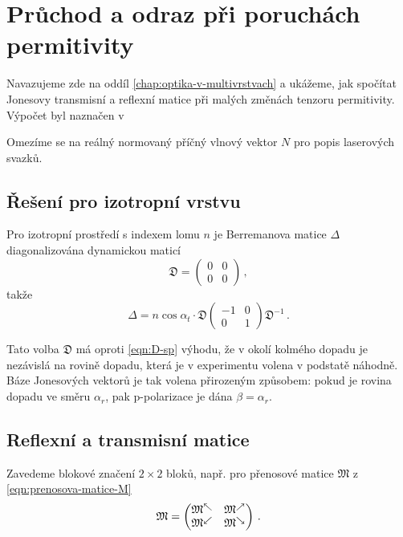 \section{Průchod a odraz při poruchách permitivity}
\label{app:berreman}

Navazujeme zde na oddíl \ref{chap:optika-v-multivrstvach} a ukážeme, jak spočítat Jonesovy transmisní a reflexní matice při malých změnách tenzoru permitivity.
Výpočet byl naznačen v 

Omezíme se na reálný normovaný příčný vlnový vektor $N$ pro popis laserových svazků.

\subsection*{Řešení pro izotropní vrstvu}

Pro izotropní prostředí s indexem lomu $n$ je Berremanova matice $\Delta$ diagonalizována dynamickou maticí
\begin{equation}
    \mathfrak{D} = \begin{pmatrix} 0&0\\0&0 \end{pmatrix} \,,
\end{equation}
takže
\begin{equation}
    \Delta = n\cos\alpha_t \cdot\mathfrak{D} \begin{pmatrix} -1&0\\0&1 \end{pmatrix} \mathfrak{D}^{-1} \,.
\end{equation}

Tato volba $\mathfrak{D}$ má oproti \eqref{eqn:D-sp} výhodu, že v okolí kolmého dopadu je nezávislá na rovině dopadu, která je v experimentu volena v podstatě náhodně.
Báze Jonesových vektorů je tak volena přirozeným způsobem: pokud je rovina dopadu ve směru $\alpha_r$, pak p-polarizace je dána $\beta=\alpha_r$.

\subsection*{Reflexní a transmisní matice}

Zavedeme blokové značení $2\times2$ bloků, např. pro přenosové matice $\mathfrak{M}$ z \eqref{eqn:prenosova-matice-M}
\begin{equation}
    \mathfrak{M} = \begin{pmatrix} \mathfrak{M}^\nwarrow & \mathfrak{M}^\nearrow \\
    \mathfrak{M}^\swarrow & \mathfrak{M}^\searrow \end{pmatrix} \,.
\end{equation}

